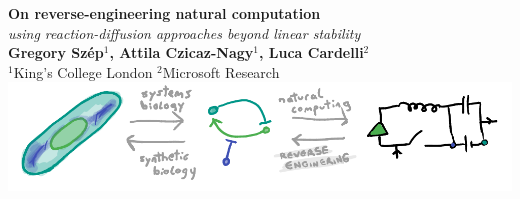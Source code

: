 \documentclass[a0,portrait]{a0poster}
\begin{document}


\begin{minipage}[b]{1.0\linewidth}
	\begin{center}
		\veryHuge \color{DarkRed} \textbf{On reverse-engineering natural computation} \color{Black}\\ %
		\Huge\textit{using reaction-diffusion approaches beyond linear stability}\\[2.4cm] %
		\huge \textbf{Gregory Sz\'ep$^1$, Attila Czicaz-Nagy$^1$, Luca Cardelli$^2$}\\[0.5cm] %
		\huge $^1$King's College London $^2$Microsoft Research\\[0.4cm] %
		\vspace{1cm}\includegraphics[width=70cm]{abstract}
	\end{center}
\end{minipage}
%
\begin{minipage}[b]{0.25\linewidth}

\end{minipage}

\vspace{1cm} %

\end{document}
